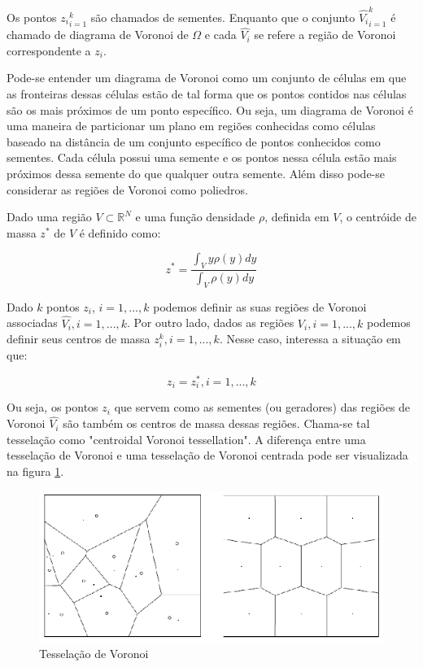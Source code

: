 Os pontos ${z_i}_{i=1}^k$ são chamados de sementes. Enquanto que o conjunto ${\hat{V_i}}_{i=1}^k$ é chamado de diagrama de Voronoi de $\Omega$ e cada $\hat{V_i}$ se refere a região de Voronoi correspondente a $z_i$.

Pode-se entender um diagrama de Voronoi como um conjunto de células em que as fronteiras dessas células estão de tal forma que os pontos contidos nas células são os mais próximos de um ponto específico. Ou seja, um diagrama de Voronoi é uma maneira de particionar um plano em regiões conhecidas como células baseado na distância de um conjunto específico de pontos conhecidos como sementes. Cada célula possui uma semente e os pontos nessa célula estão mais próximos dessa semente do que qualquer outra semente. Além disso pode-se considerar as regiões de Voronoi como poliedros.

Dado uma região $V \subset \mathbb{R}^N$ e uma função densidade $\rho$, definida em $V$, o centróide de massa $z^*$ de $V$ é definido como:

\begin{equation}
    z^* = \frac{\int_V y \rho(y) dy}{\int_V \rho(y) dy}
\end{equation}

Dado $k$ pontos $z_i$, $i=1,...,k$ podemos definir as suas regiões de Voronoi associadas $\hat{V_i},i=1,...,k$. Por outro lado, dados as regiões $\hat{V_i},i=1,...,k$ podemos definir seus centros de massa $z_i^k,i=1,...,k$. Nesse caso, interessa a situação em que:

\begin{equation}
    z_i = z_i^*, i=1,...,k
\end{equation}

Ou seja, os pontos $z_i$ que servem como as sementes (ou geradores) das regiões de Voronoi $\hat{V_i}$ são também os centros de massa dessas regiões. Chama-se tal tesselação como "centroidal Voronoi tessellation". A diferença entre uma tesselação de Voronoi e uma tesselação de Voronoi centrada pode ser visualizada na figura \ref{fig:voronoi_tessellation}.

\begin{figure}
    \centering
    \includegraphics{fig/voronoi_tessellation.eps}
    \caption[Tesselação de Voronoi]{Tesselação de Voronoi}
    \label{fig:voronoi_tessellation}
\end{figure}

